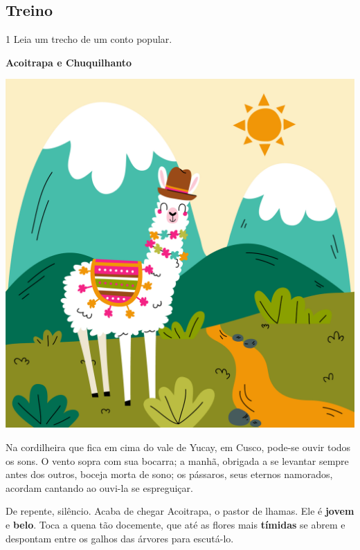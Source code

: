 \begin{conteudo}
\begin{conteudo}
\begin{conteudo}
\begin{conteudo}
\begin{conteudo}
\section*{Treino}

\num{1} Leia um trecho de um conto popular.

\begin{myquote}
\textbf{Acoitrapa e Chuquilhanto}

\begin{center}
\includegraphics[width=\textwidth]{media/image24b.jpg}
\end{center}

Na cordilheira que fica em cima do vale de Yucay, em Cusco,
pode-se ouvir todos os sons. O vento sopra com sua bocarra;
a manhã, obrigada a se levantar sempre antes dos outros,
boceja morta de sono; os pássaros, seus eternos namorados,
acordam cantando ao ouvi-la se espreguiçar.

De repente, silêncio. Acaba de chegar Acoitrapa, o
pastor de lhamas. Ele é \textbf{jovem} e \textbf{belo}. Toca a quena tão
docemente, que até as flores mais \textbf{tímidas} se abrem e
despontam entre os galhos das árvores para escutá-lo. 



\end{myquote}
\end{conteudo}
\end{conteudo}
\end{conteudo}
\end{conteudo}
\end{conteudo}
